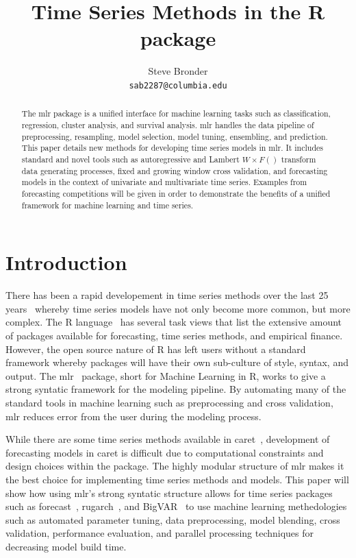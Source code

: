 \documentclass[12pt]{article}\usepackage[]{graphicx}\usepackage[]{color}
\title{Time Series Methods in the R package \pkg{mlr}}
\author{
  Steve Bronder \\
  \texttt{sab2287@columbia.edu} \\
}
\theoremstyle{definition}
\let\proglang=\textsf
\newcommand{\pkg}[1]{{\fontseries{b}\selectfont #1}}
\begin{document}

\maketitle

\begin{abstract}
The \pkg{mlr} package is a unified interface for machine learning tasks such as classification, regression, cluster analysis, and survival analysis. \pkg{mlr} handles the data pipeline of preprocessing, resampling, model selection, model tuning, ensembling, and prediction. This paper details new methods for developing time series  models in \pkg{mlr}. It includes standard and novel tools such as autoregressive and Lambert $W\times F()$ transform data generating processes, fixed and growing window cross validation, and forecasting models in the context of univariate and multivariate time series. Examples from forecasting competitions will be given in order to demonstrate the benefits of a unified framework for machine learning and time series.
  \end{abstract}


\section{Introduction}
There has been a rapid developement in time series methods over the last 25 years~\cite{Hyndman25} whereby time series models have not only become more common, but more complex. The \proglang{R} language~\cite{Rbase} has several task views that list the extensive amount of packages available for forecasting, time series methods, and empirical finance. However, the open source nature of R has left users without a standard framework whereby packages will have their own sub-culture of style, syntax, and output. The \pkg{mlr}~\cite{mlr} package, short for Machine Learning in R, works to give a strong syntatic framework for the modeling pipeline. By automating many of the standard tools in machine learning such as preprocessing and cross validation, \pkg{mlr} reduces error from the user during the modeling process. 

While there are some time series methods available in \pkg{caret}~\cite{caret}, development of forecasting models in \pkg{caret} is difficult due to computational constraints and design choices within the package. The highly modular structure of \pkg{mlr} makes it the best choice for implementing time series methods and models. This paper will show how using \pkg{mlr}'s strong syntatic structure allows for time series packages such as \pkg{forecast}~\cite{HyndForecast}, \pkg{rugarch}~\cite{rugarch}, and \pkg{BigVAR}~\cite{BigVAR} to use machine learning methedologies such as automated parameter tuning, data preprocessing, model blending, cross validation, performance evaluation, and parallel processing techniques for decreasing model build time.
\end{document}
